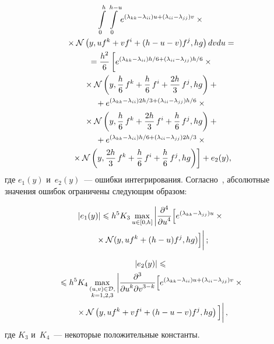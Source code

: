 \begin{multicols}{2}
\vspace*{-12pt}

   \noindent
   \begin{multline*}
   \int\limits_0^{h} \int\limits_0^{h-u}\!
e^{(\lambda_{kk}-\lambda_{i i})u+(\lambda_{i i}-\lambda_{jj})v}\times{}\\
{}\times
\mathcal{N}\left(y,uf^k+vf^{i}+(h - u- v )f^j,
 hg \right) dvdu ={} \\ 
 {}=
   \fr{h^2}{6}
   \left[
   \vphantom{\fr{2}{6}}
e^{(\lambda_{kk}-\lambda_{i i}){h}/{6}+(\lambda_{i i}-\lambda_{jj})
{h}/{6}}\times{}\right.\\
{}\times
\mathcal{N}\left(y,\fr{h}{6}\,f^k+\fr{h}{6}\,f^{i}+\fr{2h}{3}\,f^j,
 hg \right) + {}\\ 
 {}+ 
 e^{(\lambda_{kk}-\lambda_{i i}){2h}/{3}+
 (\lambda_{i i}-\lambda_{jj}){h}/{6}}\times{}\\
 {}\times
\mathcal{N}\left(y,\fr{h}{6}\,f^k+\fr{2h}{3}\,f^{i}+\fr{h}{6}\,f^j,
 hg \right) +{} \\ 
 {}+ 
 e^{(\lambda_{kk}-\lambda_{i i}){h}/{6}+
 (\lambda_{i i}-\lambda_{jj}){2h}/{3}}\times{}\\
 \left.{}\times
\mathcal{N}\left(y,\fr{2h}{3}\,f^k+\fr{h}{6}\,f^{i}+\fr{h}{6}\,f^j,
 hg \right)
    \right] + e_2(y),
   \end{multline*}
   где $e_1(y)$ и~$e_2(y)$~--- ошибки интегрирования. Согласно~\cite{IK_94}, 
   абсолютные значения ошибок ограничены следующим образом:
   
   \noindent
   \begin{multline}
   |e_1(y)| \leqslant h^5 K_3\max\limits_{u \in [0,h]}
   \left|\fr{\partial^4}{\partial u^4}
   \Big[e^{(\lambda_{kk}-\lambda_{jj})u}\times{}
   \right.\\
   \left.{}\times
   \mathcal{N}(y,uf^k+(h-u)f^j,hg)
   \Big]
   \vphantom{\fr{\partial^4}{\partial u^4}}
   \right|;
   \label{eq:e_1_def}
   \end{multline}
   
\vspace*{-12pt}

   \noindent
   \begin{multline*}
   |e_2(y)| \leqslant {}\\
   {} \leqslant h^5 K_4
   \max\limits_{\substack{{(u,v) \in \mathcal{D},}\\
{k=1,2,3}}}
   \left\vert
   \fr{\partial^3}{\partial u^k\partial v^{3-k}}\Big[
   e^{(\lambda_{kk}-\lambda_{i i})u+(\lambda_{i i}-\lambda_{jj})v}\times{}\right.\\
   \left.{}\times
\mathcal{N}\left(y,uf^k+vf^{i}+(h - u- v )f^j, hg \right)
 \Big]
 \vphantom{   \fr{\partial^3}{\partial u^k\partial v^{3-k}}}
 \right\vert,
   \end{multline*}
   где $K_3$ и~$K_4$~--- некоторые положительные кон\-станты.


\end{multicols}

